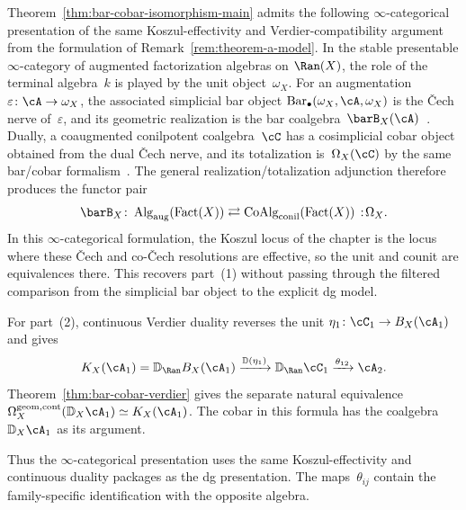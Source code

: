 \begin{remark}
Theorem~\ref{thm:bar-cobar-isomorphism-main} admits the following
$\infty$-categorical presentation of the same Koszul-effectivity and
Verdier-compatibility argument from the formulation of
Remark~\ref{rem:theorem-a-model}. In the stable presentable
$\infty$-category of augmented factorization algebras on
$\Ran(X)$, the role of the terminal algebra~$k$ is played by the unit
object~$\omega_X$. For an augmentation
$\varepsilon\colon\cA\to\omega_X$, the associated simplicial bar object
$\operatorname{Bar}_\bullet(\omega_X,\cA,\omega_X)$ is the
\v{C}ech nerve of~$\varepsilon$, and its geometric realization is the
bar coalgebra~$\barB_X(\cA)$~\cite[Chapter~5, especially
\S\S5.2.2--5.2.4]{HA}. Dually, a coaugmented conilpotent
coalgebra~$\cC$ has a cosimplicial cobar object obtained from the dual
\v{C}ech nerve, and its totalization is~$\Omega_X(\cC)$ by the same
bar\slash cobar formalism~\cite[Chapter~5, especially
\S\S5.2.3--5.2.4]{HA}. The general realization\slash totalization
adjunction therefore produces the functor pair
\[
\barB_X \colon
\operatorname{Alg}_{\mathrm{aug}}(\operatorname{Fact}(X))
\rightleftarrows
\operatorname{CoAlg}_{\mathrm{conil}}(\operatorname{Fact}(X))
\,:\!\Omega_X.
\]
In this $\infty$-categorical formulation, the Koszul locus of the
chapter is the locus where these \v{C}ech and co-\v{C}ech resolutions
are effective, so the unit and counit are equivalences there. This
recovers part~\textup{(1)} without passing through the filtered
comparison from the simplicial bar object to the explicit dg model.

For part~\textup{(2)}, continuous Verdier duality reverses the unit
$\eta_1\colon\cC_1\to B_X(\cA_1)$ and gives
\[
K_X(\cA_1)=\mathbb D_{\Ran}B_X(\cA_1)
\xrightarrow{\mathbb D(\eta_1)}
\mathbb D_{\Ran}\cC_1
\xrightarrow{\theta_{12}}\cA_2.
\]
Theorem~\ref{thm:bar-cobar-verdier} gives the separate natural
equivalence
$\Omega_X^{\mathrm{geom,cont}}(\mathbb D_X\cA_1)\simeq K_X(\cA_1)$.
The cobar in this formula has the coalgebra $\mathbb D_X\cA_1$ as its
argument.

Thus the $\infty$-categorical presentation uses the same
Koszul-effectivity and continuous duality packages as the dg
presentation.  The maps~$\theta_{ij}$ contain the family-specific
identification with the opposite algebra.
\end{remark}


